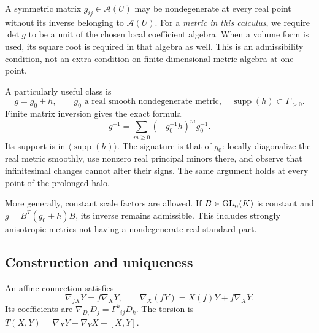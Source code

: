 \documentclass[11pt,letterpaper]{article}
\theoremstyle{definition}
\theoremstyle{remark}
\newcommand{\A}{\mathscr A}\newcommand{\OO}{\mathcal O}\newcommand{\mm}{\mathfrak m}
\newcommand{\supp}{\operatorname{supp}}\newcommand{\st}{\operatorname{st}}
\begin{document}
A symmetric matrix $g_{ij}\in\A(U)$ may be nondegenerate at every real
point without its inverse belonging to $\A(U)$. For a \emph{metric in this
calculus}, we require $\det g$ to be a unit of the chosen local coefficient
algebra. When a volume form is used, its square root is required in that
algebra as well. This is an admissibility condition, not an extra condition
on finite-dimensional metric algebra at one point.

A particularly useful class is
\begin{equation}\label{vtf:eq:regularmetric}
 g=g_0+h,\qquad g_0\text{ a real smooth nondegenerate metric},
 \quad\supp(h)\subset\Gamma_{>0}.
\end{equation}
Finite matrix inversion gives the exact formula
\begin{equation}\label{vtf:eq:metricinverse}
 g^{-1}=\sum_{m\ge0}(-g_0^{-1}h)^m g_0^{-1}.
\end{equation}
Its support is in $\langle\supp(h)\rangle$. The signature is that of $g_0$:
locally diagonalize the real metric smoothly, use nonzero real principal
minors there, and observe that infinitesimal changes cannot alter their signs.
The same argument holds at every point of the prolonged halo.

More generally, constant scale factors are allowed. If $B\in\operatorname{GL}_n(K)$ is
constant and $g=B^T(g_0+h)B$, its inverse remains admissible. This includes
strongly anisotropic metrics not having a nondegenerate real standard part.

\subsection{Construction and uniqueness}

An affine connection satisfies
\[
 \nabla_{fX}Y=f\nabla_XY,\qquad
 \nabla_X(fY)=X(f)Y+f\nabla_XY.
\]
Its coefficients are $\nabla_{D_i}D_j=\Gamma^k{}_{ij}D_k$.
The torsion is $T(X,Y)=\nabla_XY-\nabla_YX-[X,Y]$.
\end{document}
